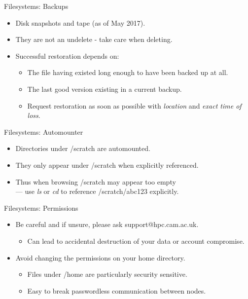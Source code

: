 \begin{frame}{Filesystems: Backups}
\begin{itemize}
\item<1->{Disk snapshots and tape (as of May 2017).}
\item<2->{{\color{red}They are not an undelete - take care when deleting.}}
\item<3->{Successful restoration depends on:}
\begin{itemize}
\item{The file having existed long enough to have been backed up at all.}
\item{The last good version existing in a current backup.}
\item<4->{\color{red}Request restoration as soon as possible with \emph{location} and \emph{exact time of loss}.}
\medskip
{}
\end{itemize}
\end{itemize}
\end{frame}

\begin{frame}{Filesystems: Automounter}
\begin{itemize}
\item{Directories under /scratch are \alert{automounted}.}
\item{They only appear under /scratch when explicitly referenced.}
\item{Thus when browsing /scratch may appear too empty\hfill\\
\qquad\alert{--- use \emph{ls} or \emph{cd} to reference /scratch/abc123 explicitly.}}
\end{itemize}
\end{frame}

\begin{frame}{Filesystems: Permissions}
\begin{itemize}
\item{\color{red}Be careful and if unsure, please ask support@hpc.cam.ac.uk.}
\begin{itemize}
\item{Can lead to \alert{accidental destruction} of your data or \alert{account compromise}.}
\end{itemize}
\item{Avoid changing the permissions on your home directory.}
\begin{itemize}
\item{Files under /home are particularly security sensitive.}
\item{Easy to break passwordless communication between nodes.}
\end{itemize}
\end{itemize}
\end{frame}


